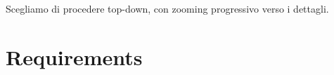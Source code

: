 \documentclass{../llncs}
\newcommand{\fname}[1]{{\small{\color{magenta}\texttt{#1}}}}
\newcommand{\labelsec}[1]{\label{sec:#1}}
\begin{document}
Scegliamo di procedere top-down, con zooming progressivo verso i dettagli.

\section{Requirements}
\labelsec{Requirements}

\end{document}
